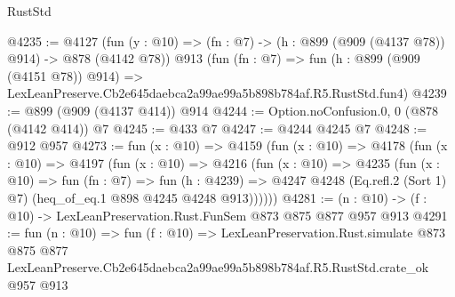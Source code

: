 \begin{lexlean}{RustStd}
\begin{coremodule}
@4235 := @4127
    (fun (y : @10) => (fn : @7) -> (h : @899 (@909 (@4137 @78)) @914) -> @878 (@4142 @78))
    @913
    (fun (fn : @7) =>
    fun (h : @899 (@909 (@4151 @78)) @914) =>
    LexLeanPreserve.Cb2e645daebca2a99ae99a5b898b784af.R5.RustStd.fun4)
@4239 := @899 (@909 (@4137 @414)) @914
@4244 := Option.noConfusion.{0, 0} (@878 (@4142 @414)) @7
@4245 := @433 @7
@4247 := @4244 @4245 @7
@4248 := @912 @957
@4273 := fun (x : @10) =>
  @4159
    (fun (x : @10) =>
    @4178
      (fun (x : @10) =>
      @4197
        (fun (x : @10) =>
        @4216
          (fun (x : @10) =>
          @4235
            (fun (x : @10) =>
            fun (fn : @7) =>
            fun (h : @4239) =>
            @4247 @4248 (Eq.refl.{2} (Sort 1) @7) (heq_of_eq.{1} @898 @4245 @4248 @913))))))
@4281 := (n : @10) -> (f : @10) -> LexLeanPreservation.Rust.FunSem @873 @875 @877 @957 @913
@4291 := fun (n : @10) =>
  fun (f : @10) =>
  LexLeanPreservation.Rust.simulate
    @873
    @875
    @877
    LexLeanPreserve.Cb2e645daebca2a99ae99a5b898b784af.R5.RustStd.crate_ok
    @957
    @913
\end{coremodule}
\end{lexlean}
